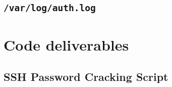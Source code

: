 \documentclass[12pt]{report}
\begin{document}
\section{\texttt{/var/log/auth.log}}
\label{app:files:authlog}


\pagebreak
\chapter{Code deliverables}
\section{SSH Password Cracking Script}
\label{app:code:sshcrack_mp}

\end{document}
